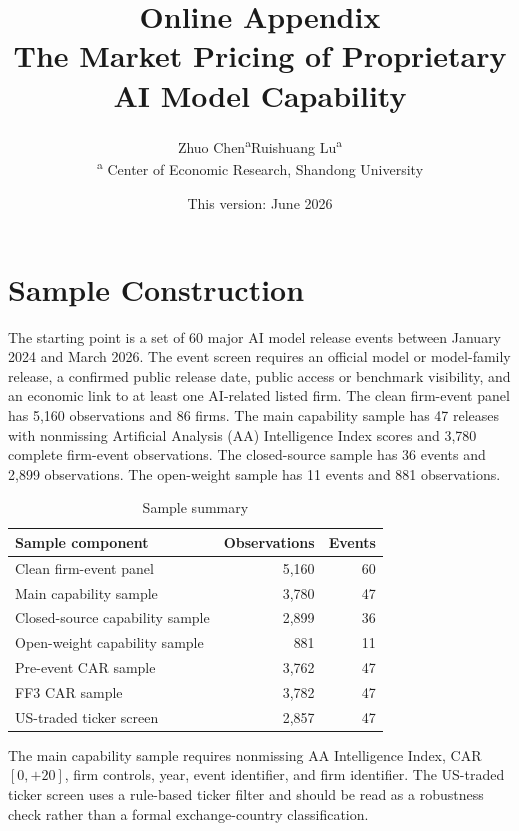\documentclass[12pt]{article}
\title{\textbf{Online Appendix}\\
\large The Market Pricing of Proprietary AI Model Capability}
\author{\begin{tabular}{c}
Zhuo Chen\textsuperscript{a}\quad Ruishuang Lu\textsuperscript{a}\\[0.5em]
{\footnotesize \textsuperscript{a} Center of Economic Research, Shandong University}
\end{tabular}}
\date{\small This version: June 2026}
\begin{document}
\maketitle

\section{Sample Construction}
\label{app:sample}

The starting point is a set of 60 major AI model release events between January
2024 and March 2026. The event screen requires an official model or model-family
release, a confirmed public release date, public access or benchmark visibility,
and an economic link to at least one AI-related listed firm. The clean
firm-event panel has 5,160 observations and 86 firms. The main capability sample
has 47 releases with nonmissing Artificial Analysis (AA) Intelligence Index
scores and 3,780 complete firm-event observations. The closed-source sample has
36 events and 2,899 observations. The open-weight sample has 11 events and 881
observations.

\begin{table}[htbp]
\centering
\caption{Sample summary}
\label{tab:a_sample}
\begin{threeparttable}
\begin{tabular}{lrr}
\toprule
Sample component & Observations & Events \\
\midrule
Clean firm-event panel & 5,160 & 60 \\
Main capability sample & 3,780 & 47 \\
Closed-source capability sample & 2,899 & 36 \\
Open-weight capability sample & 881 & 11 \\
Pre-event CAR sample & 3,762 & 47 \\
FF3 CAR sample & 3,782 & 47 \\
US-traded ticker screen & 2,857 & 47 \\
\bottomrule
\end{tabular}
\begin{tablenotes}[flushleft]\footnotesize
\item The main capability sample requires nonmissing AA Intelligence Index,
CAR$[0,{+}20]$, firm controls, year, event identifier, and firm identifier.
The US-traded ticker screen uses a rule-based ticker filter and should be read as
a robustness check rather than a formal exchange-country classification.
\end{tablenotes}
\end{threeparttable}
\end{table}
\end{document}
